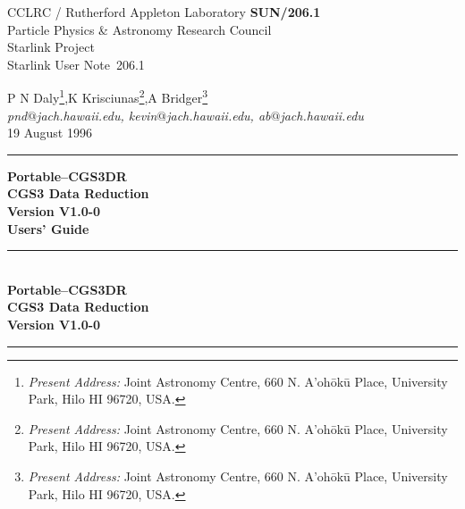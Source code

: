 \documentclass[a4paper]{book}
\makeatletter
\newcommand{\stardoccategory}  {Starlink User Note}
\newcommand{\stardocinitials}  {SUN}
\newcommand{\stardocnumber}    {206.1}
\newcommand{\stardocauthors}   {P N Daly}
\newcommand{\stardoccoauthor}  {K Krisciunas}
\newcommand{\stardoccocoauthor} {A Bridger}
\newcommand{\stardocaddress}   {pnd$@$jach.hawaii.edu, kevin$@$jach.hawaii.edu, ab$@$jach.hawaii.edu}
\newcommand{\stardocdate}      {19 August 1996}
\newcommand{\stardoctitle}     {Portable--CGS3DR \\
                                CGS3 Data Reduction}
\newcommand{\stardocversion}   {Version V1.0-0}
\newcommand{\stardocmanual}    {Users' Guide}
\newcommand{\stardocname}{\stardocinitials /\stardocnumber}
\renewcommand{\_}{{\tt\char'137}}
\makeatother
\begin{document}
\thispagestyle{empty}
CCLRC / {\sc Rutherford Appleton Laboratory} \hfill {\bf \stardocname}\\
{\large Particle Physics \& Astronomy Research Council}\\
{\large Starlink Project\\}
{\large \stardoccategory\ \stardocnumber}
\begin{flushright}
\stardocauthors\footnote[2]{{\em Present Address:}
 {\sf Joint Astronomy Centre, 660 N. A'oh\={o}k\={u} Place, University Park,
  Hilo HI 96720, USA.}},\stardoccoauthor\footnote[3]{{\em Present Address:}
 {\sf Joint Astronomy Centre, 660 N. A'oh\={o}k\={u} Place, University Park,
  Hilo HI 96720, USA.}},\stardoccocoauthor\footnote[4]{{\em Present Address:}
 {\sf Joint Astronomy Centre, 660 N. A'oh\={o}k\={u} Place, University Park,
  Hilo HI 96720, USA.}} \\
{\em \stardocaddress} \\
\stardocdate
\end{flushright}
\vspace{-4mm}
\rule{\textwidth}{0.5mm}
\vspace{5mm}
\begin{center}
{\Huge\bf  \stardoctitle \\ [2.5ex]}
{\LARGE\bf \stardocversion \\ [4ex]}
{\Huge\bf  \stardocmanual}
\end{center}
\vspace{20mm}

\newpage
\thispagestyle{empty}

\vspace*{\fill}

\begin {center}
\rule{80mm}{0.5mm} \\ [1ex]
{\Large\bf \stardoctitle \\ [2.5ex]
           \stardocversion} \\ [2ex]
\rule{80mm}{0.5mm}
\end{center}

\vspace*{\fill}

\newpage
{}
\pagestyle{myheadings}
\markright{\stardocname}

\tableofcontents
\setlength{\parskip}{\medskipamount}
\end{document}
